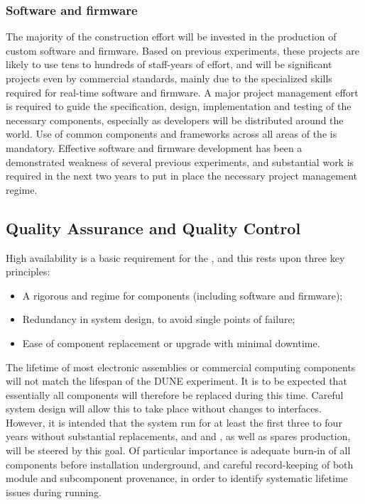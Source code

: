 \subsubsection{Software and firmware}

The majority of the  construction effort will be invested in the production of custom software and firmware. Based on previous experiments, these projects are likely to use tens to hundreds of staff-years of effort, and will be significant projects even by commercial standards, mainly due to the specialized skills required for real-time software and firmware. A major project management effort is required to guide the specification, design, implementation and testing of the necessary components, especially as developers will be distributed around the world. Use of common components and frameworks across all areas of the  is mandatory. Effective  software and firmware development has been a demonstrated weakness of several previous experiments, and substantial work is required %
 in the next two years to put in place the necessary project management regime.

\subsection{Quality Assurance and Quality Control}

High availability is a basic requirement for the , and this rests upon three key principles:

\begin{itemize}
	\item A rigorous  and  regime for components (including software and firmware);
	\item Redundancy in system design, to avoid single points of failure;
	\item Ease of component replacement or upgrade with minimal downtime.
\end{itemize}

The lifetime of most electronic assemblies or commercial computing components will not match the \dunelifetime lifespan of the DUNE experiment. It is to be expected that essentially all components will therefore be replaced during this time. Careful system design will allow this to take place without changes to interfaces. However, it is intended that the system  run for at least the first three to four years without substantial replacements, and  and , as well as spares production, will be steered by this goal. Of particular importance is adequate burn-in of all components before installation underground, and careful record-keeping of both module and subcomponent provenance, in order to identify systematic lifetime issues during running.

